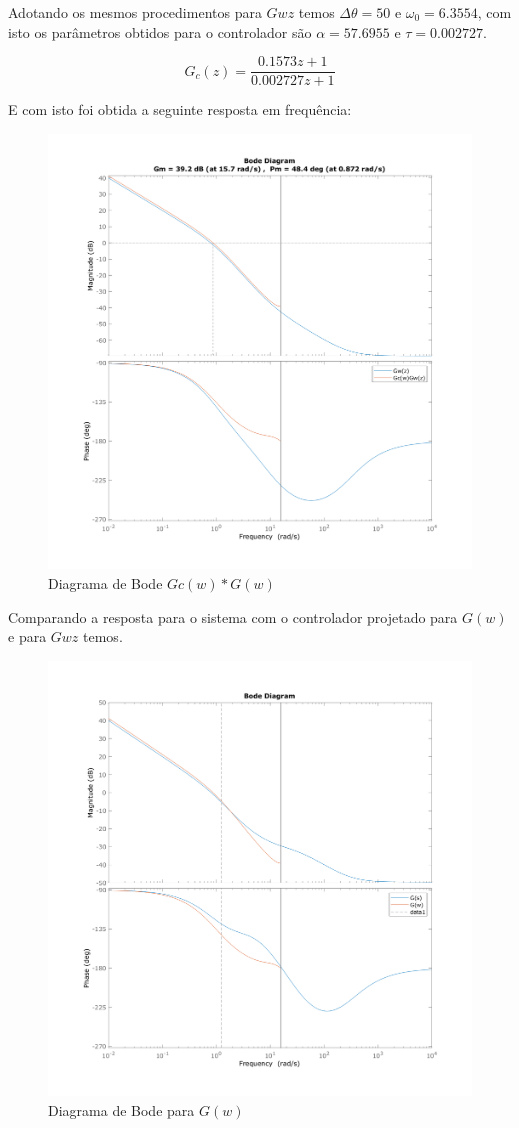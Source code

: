 \documentclass[a4paper,11pt]{article}
\begin{document}
Adotando os mesmos procedimentos para $Gwz$ temos $\Delta \theta = 50$ e $\omega_0 = 6.3554$, com isto os parâmetros obtidos para o controlador são $\alpha = 57.6955$ e $\tau = 0.002727$.

\begin{equation}
    G_c(z) = \frac{0.1573 z + 1}{0.002727 z + 1}
\end{equation}


E com isto foi obtida a seguinte resposta em frequência:

\begin{figure}[H]
    \centering
    \includegraphics[width=0.8\linewidth]{img/exsim4-control-gzw.png}
    \caption{Diagrama de Bode $Gc(w)*G(w)$}
\end{figure}

Comparando a resposta para o sistema com o controlador projetado para $G(w)$ e para $Gwz$ temos.

\begin{figure}[H]
    \centering
    \includegraphics[width=0.8\linewidth]{img/exsim4-bodeplot-compare-control.png}
    \caption{Diagrama de Bode para $G(w)$}
\end{figure}
\end{document}
